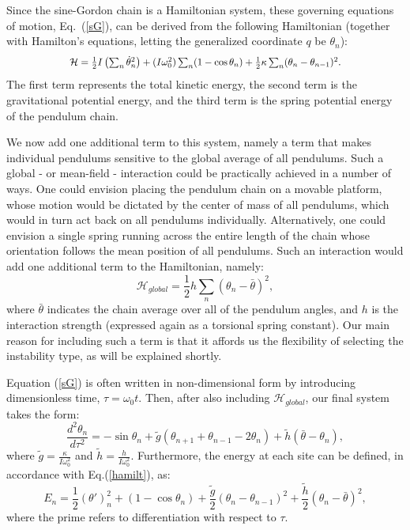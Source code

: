 \documentclass[11pt]{article}
\begin{document}
Since the sine-Gordon chain is a Hamiltonian system, these governing equations of motion, Eq.~(\ref{sG}), can be derived from the following Hamiltonian (together with Hamilton's equations, letting the generalized coordinate $q$ be $\theta_n$):
\begin{equation}
    \label{hamilt}
    \scalebox{0.89}{$
        \mathcal{H}=\frac{1}{2} I \left(\sum_n \dot{\theta}_n^2\right) + 
        (I \omega_0^2) \sum_n (1-\cos \theta_n)+\frac{1}{2} \kappa \sum_n (\theta_n-\theta_{n-1})^2.
    $}
\end{equation}
The first term represents the total kinetic energy, the second term is the gravitational potential energy, and the third term is the spring potential energy of the pendulum chain.

We now add one additional term to this system, namely a term that makes individual pendulums sensitive to the global average of all pendulums. Such a global - or mean-field - interaction could be practically achieved in a number of ways. One could envision placing the pendulum chain on a movable platform, whose motion would be dictated by the center of mass of all pendulums, which would in turn act back on all pendulums individually. Alternatively, one could envision a single spring running across the entire length of the chain whose orientation follows the mean position of all pendulums. Such an interaction would add one additional term to the Hamiltonian, namely:
\begin{equation}
    \label{hamiltglobal}
    \mathcal{H}_{global}=\frac{1}{2} h \sum_n(\theta_n-\bar{\theta})^2,
\end{equation}
where $\bar{\theta}$ indicates the chain average over all of the pendulum angles, and $h$ is the interaction strength (expressed again as a torsional spring constant). Our main reason for including such a term is that it affords us the flexibility of selecting the instability type, as will be explained shortly.    

Equation (\ref{sG}) is often written in non-dimensional form by introducing dimensionless time, $\tau=\omega_0 t$. 
Then, after also including $\mathcal{H}_{global}$, our final system takes the form:
\begin{equation}
\label{govern}
\frac{d^2\theta_n}{d\tau^2} = -\sin{\theta_n}+\tilde{g}\left(\theta_{n+1}+\theta_{n-1}-2\theta_n \right)+\tilde{h}(\bar{\theta}-\theta_n),
\end{equation}
where $\tilde{g}=\frac{\kappa}{I\omega_0^2}$ and $\tilde{h}=\frac{h}{I\omega_0^2}$.
%
Furthermore, the energy at each site can be defined, in accordance with Eq.(\ref{hamilt}), as:
\begin{equation}
\label{energy}
    E_n = \frac{1}{2} (\theta')_n^2+(1-\cos \theta_n)+\frac{\tilde{g}}{2}  (\theta_n-\theta_{n-1})^2 + \frac{\tilde{h}}{2}(\theta_n-\bar{\theta})^2,
\end{equation}
where the prime refers to differentiation with respect to $\tau$.
\end{document}
